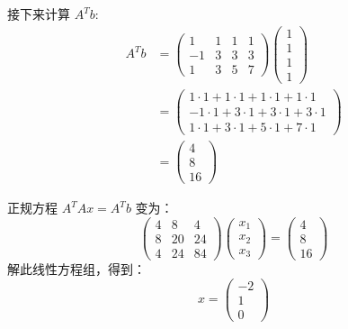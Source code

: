 \documentclass[12pt, a4paper]{article}
\begin{document}
接下来计算 $A^Tb$:
\begin{align*}
A^Tb &= \begin{pmatrix}
1 & 1 & 1 & 1 \\
-1 & 3 & 3 & 3 \\
1 & 3 & 5 & 7
\end{pmatrix}
\begin{pmatrix}
1 \\
1 \\
1 \\
1
\end{pmatrix} \\
&= \begin{pmatrix}
1 \cdot 1 + 1 \cdot 1 + 1 \cdot 1 + 1 \cdot 1 \\
-1 \cdot 1 + 3 \cdot 1 + 3 \cdot 1 + 3 \cdot 1 \\
1 \cdot 1 + 3 \cdot 1 + 5 \cdot 1 + 7 \cdot 1
\end{pmatrix} \\
&= \begin{pmatrix}
4 \\
8 \\
16
\end{pmatrix}
\end{align*}

正规方程 $A^TAx = A^Tb$ 变为：
\[ \begin{pmatrix}
4 & 8 & 4 \\
8 & 20 & 24 \\
4 & 24 & 84
\end{pmatrix}
\begin{pmatrix}
x_1 \\
x_2 \\
x_3
\end{pmatrix} =
\begin{pmatrix}
4 \\
8 \\
16
\end{pmatrix} \]
解此线性方程组，得到：
\[ x = \begin{pmatrix}
-2 \\
1 \\
0
\end{pmatrix} \]
\end{document}
